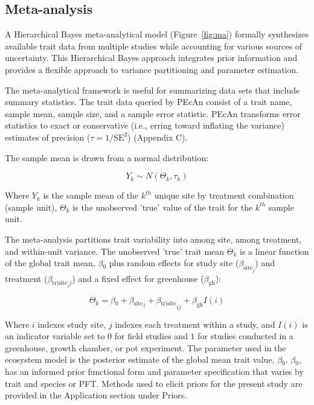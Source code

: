 \documentclass[12pt]{article}
\begin{document}
\begin{flushleft}
\begin{spacing}{1.9}
\subsection*{Meta-analysis}
\label{sec:mamodel}
 A Hierarchical Bayes meta-analytical model (Figure~\ref{fig:ma}) formally synthesizes available trait data from multiple studies while accounting for various sources of uncertainty.
 This Hierarchical Bayes approach integrates prior information and provides a flexible approach to variance partitioning and parameter estimation.

 The meta-analytical framework is useful for summarizing data sets that include summary statistics. 
 The trait data queried by PEcAn consist of a trait name, sample mean, sample size, and a sample error statistic. 
 PEcAn transforms error statistics to exact or conservative (i.e., erring toward inflating the variance) estimates of precision ($\tau = 1/\text{SE}^2$) (Appendix C).

 The sample mean is drawn from a normal distribution:

\begin{equation}\label{eq:datamodel}
 Y_{k}\sim N(\Theta_{k}, \tau_{k})
\end{equation}

 Where $Y_{k}$ is the sample mean of the $k^{th}$ unique site by treatment combination (sample unit), $\Theta_{k}$ is the unobserved 'true' value of the trait for the $k^{th}$ sample unit.

 The meta-analysis partitions trait variability into among site, among treatment, and within-unit variance.
 The unobserved 'true' trait mean $\Theta_k$ is a linear function of the global trait mean, $\beta{_0}$ plus random effects for study site ($\beta_{\text{site}_j}$) and treatment ($\beta_{\text{tr|site}_ij}$) and a fixed effect for greenhouse ($\beta_{\text{gh}}$):

\begin{equation}\label{eq:mamodel}
 \Theta_{k} = \beta{_0} + \beta{_{\text{site}}}_{i} + \beta{_{\text{tr|site}}}_{ij} + \beta_{\text{gh}} I(i)
\end{equation}

 Where $i$ indexes study site, $j$ indexes each treatment within a study, and $I(i)$ is an indicator variable set to $0$ for field studies and $1$ for studies conducted in a greenhouse, growth chamber, or pot experiment.
 The parameter used in the ecosystem model is the posterior estimate of the global mean trait value, $\beta{_0}$. 
 $\beta{_0}$, has an informed prior functional form and parameter specification that varies by trait and species or PFT.
 Methods used to elicit priors for the present study are provided in the Application section under Priors.


\end{spacing}
\end{flushleft}
\end{document}
